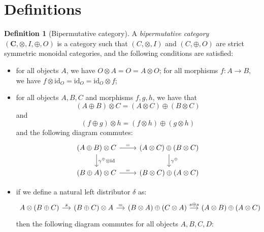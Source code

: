 \documentclass[a4paper]{article}
\theoremstyle{plain}
\theoremstyle{definition}
\newtheorem{definition}[theorem]{Definition}
\newcommand{\cat}[1]{\mathbf{#1}}
\newcommand{\symplus}{\gamma^\oplus}
\newcommand{\iid}{\mathrm{id}}
\begin{document}
\section{Definitions}
\label{app:defs}
\begin{definition}[Bipermutative category]
	A \emph{bipermutative category} $(\cat C, \otimes, I, \oplus, O)$ is a
	category such that $(C, \otimes, I)$ and $(C, \oplus, O)$ are strict
	symmetric monoidal categories, and the following conditions are satisfied:
	\begin{itemize}
		\item for all objects $A$, we have $O \otimes A = O = A \otimes O$; for
			all morphisms $f \colon A \to B$, we have $f \otimes \iid_O =
			\iid_O = \iid_O \otimes f$;
		\item for all objects $A, B, C$ and morphisms $f, g, h$, we have that
			\begin{equation}\label{eq:biper-eq-types}
				(A \oplus B) \otimes C = (A \otimes C) \oplus (B \otimes C)
			\end{equation}
			and
			\begin{equation}\label{eq:biper-eq}
				(f \oplus g) \otimes h = (f \otimes h) \oplus (g \otimes h)
			\end{equation}
			and the following diagram commutes:
			\begin{equation}\label{eq:biper-sym}
				\begin{tikzcd}
					(A \oplus B) \otimes C & (A \otimes C) \oplus (B \otimes C) \\
					(B \oplus A) \otimes C & (B \otimes C) \oplus (A \otimes C)
					\arrow["=", from=1-1, to=1-2]
					\arrow["=", from=2-1, to=2-2]
					\arrow["\symplus \otimes \iid", from=1-1, to=2-1]
					\arrow["\symplus", from=1-2, to=2-2]
				\end{tikzcd}
			\end{equation}
		\item if we define a natural left distributor $\delta$ as:
			\begin{equation}\label{eq:biper-dist}
				\begin{tikzcd}[column sep=small]
					A \otimes (B \oplus C) & (B \oplus C) \otimes A & (B
					\otimes A) \oplus (C \otimes A) & (A \otimes B) \oplus (A
					\otimes C)
					\arrow["s", from=1-1, to=1-2]
					\arrow["=", from=1-2, to=1-3]
					\arrow["s \oplus s", from=1-3, to=1-4]
				\end{tikzcd}
			\end{equation}
			then the following diagram commutes for all objects $A, B, C, D$:

\end{itemize}
\end{definition}
\end{document}
